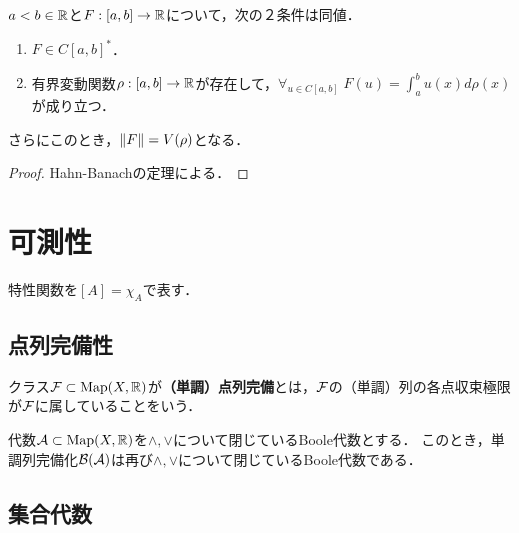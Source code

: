 \documentclass[uplatex,dvipdfmx]{jsreport}
\begin{document}
\begin{theorem}[有界閉区間上の連続関数の空間の双対空間]
    $a<b\in\mathbb{R}$と$F:[a,b]\to\mathbb{R}$について，次の２条件は同値．
    \begin{enumerate}
        \item $F\in C[a,b]^*$．
        \item 有界変動関数$\rho:[a,b]\to\mathbb{R}$が存在して，$\forall_{u\in C[a,b]}\;F(u)=\int^b_au(x)d\rho(x)$が成り立つ．
    \end{enumerate}
    さらにこのとき，$\|F\|=V(\rho)$となる．
\end{theorem}
\begin{proof}
    Hahn-Banachの定理による．
\end{proof}

\section{可測性}

\begin{notation}
    特性関数を$[A]=\chi_A$で表す．
\end{notation}

\subsection{点列完備性}

\begin{definition}
    クラス$\mathcal{F}\subset\mathrm{Map}(X,\mathbb{R})$が\textbf{（単調）点列完備}とは，$\mathcal{F}$の（単調）列の各点収束極限が$\mathcal{F}$に属していることをいう．
\end{definition}

\begin{lemma}\label{lemma-sequential-completion}
    代数$\mathcal{A}\subset\mathrm{Map}(X,\mathbb{R})$を$\land,\lor$について閉じているBoole代数とする．
    このとき，単調列完備化$\mathcal{B}(\mathcal{A})$は再び$\land,\lor$について閉じているBoole代数である．
\end{lemma}

\subsection{集合代数}
\end{document}
